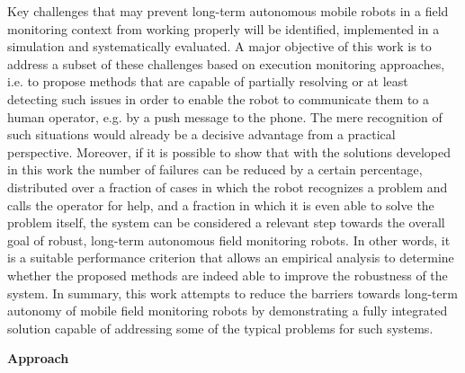 \documentclass[english, master, utf8]{base/thesis_KBS}
\begin{document}
Key challenges that may prevent long-term autonomous mobile robots in a field monitoring context from working properly will be identified, implemented 
in a simulation and systematically evaluated. A major objective of this work is to address a subset of these challenges based on execution monitoring approaches,
i.e. to propose methods that are capable of partially resolving or at least detecting such issues in order to enable the robot to communicate them to a human operator,
e.g. by a push message to the phone. The mere recognition of such situations would already be a decisive advantage from a practical perspective. Moreover, if it is possible
to show that with the solutions developed in this work the number of failures can be reduced by a certain percentage, distributed over a fraction of cases in which the robot 
recognizes a problem and calls the operator for help, and a fraction in which it is even able to solve the problem itself, the system can be considered a relevant step towards 
the overall goal of robust, long-term autonomous field monitoring robots. In other words, it is a suitable performance criterion that allows an empirical analysis to
determine whether the proposed methods are indeed able to improve the robustness of the system. In summary, this work attempts to reduce the barriers towards long-term
autonomy of mobile field monitoring robots by demonstrating a fully integrated solution capable of addressing some of the typical problems for such systems.\newline

\textbf{Approach}\newline
\end{document}
